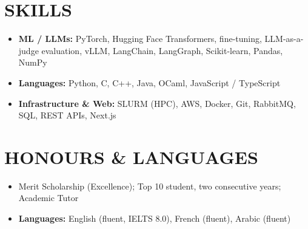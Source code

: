 \documentclass[10pt, a4paper]{article}
\begin{document}
\section*{SKILLS}
\begin{itemize}
    \item \textbf{ML / LLMs:} PyTorch, Hugging Face Transformers, fine-tuning, LLM-as-a-judge evaluation, vLLM, LangChain, LangGraph, Scikit-learn, Pandas, NumPy
    \item \textbf{Languages:} Python, C, C++, Java, OCaml, JavaScript / TypeScript
    \item \textbf{Infrastructure \& Web:} SLURM (HPC), AWS, Docker, Git, RabbitMQ, SQL, REST APIs, Next.js
\end{itemize}

\section*{HONOURS \& LANGUAGES}
\begin{itemize}
    \item Merit Scholarship (Excellence); Top 10 student, two consecutive years; Academic Tutor
    \item \textbf{Languages:} English (fluent, IELTS 8.0), French (fluent), Arabic (fluent)
\end{itemize}
\end{document}

